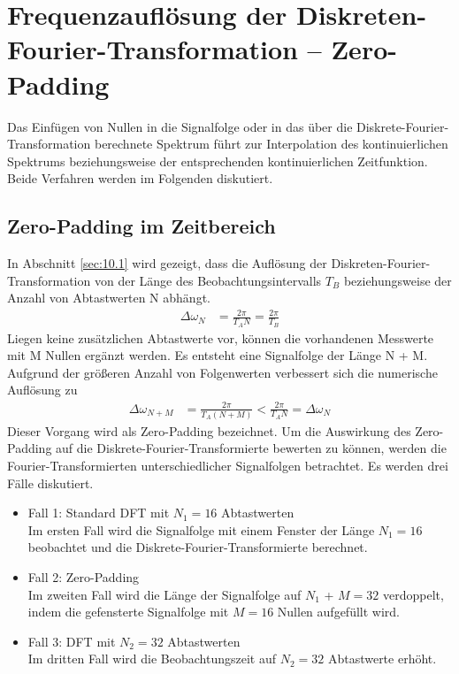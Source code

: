 \section{Frequenzauflösung der Diskreten-Fourier-Transformation -- Zero-Padding}\label{sec:10.4}

Das Einfügen von Nullen in die Signalfolge oder in das über die Diskrete-Fourier-Transformation berechnete Spektrum führt zur Interpolation des kontinuierlichen Spektrums beziehungsweise der entsprechenden kontinuierlichen Zeitfunktion. Beide Verfahren werden im Folgenden diskutiert.

\subsection{Zero-Padding im Zeitbereich}\label{sec:zero-padding-im-zeitbereich}

In Abschnitt \ref{sec:10.1} wird gezeigt, dass die Auflösung der Diskreten-Fourier-Transformation von der Länge des Beobachtungsintervalls \(T_{B}\) beziehungsweise der Anzahl von Abtastwerten N abhängt.
\begin{align}
\Delta\omega_{N} &= \frac{2  \pi}{T_{A}  N} = \frac{2  \pi}{T_{B}} \label{eq:10.75}
\end{align}
Liegen keine zusätzlichen Abtastwerte vor, können die vorhandenen Messwerte mit M Nullen ergänzt werden. Es entsteht eine Signalfolge der Länge N + M. Aufgrund der größeren Anzahl von Folgenwerten verbessert sich die numerische Auflösung zu
\begin{align}
\Delta\omega_{N + M} &= \frac{2  \pi}{T_{A}  (N + M)} < \frac{2  \pi}{T_{A}  N} = \Delta\omega_{N} \label{eq:10.76}
\end{align}
Dieser Vorgang wird als Zero-Padding bezeichnet. Um die Auswirkung des Zero-Padding auf die Diskrete-Fourier-Transformierte bewerten zu können, werden die Fourier-Transformierten unterschiedlicher Signalfolgen betrachtet. Es werden drei Fälle diskutiert.

\begin{itemize}
\item
  Fall 1: Standard DFT mit \(N_{1} = 16\) Abtastwerten\\
  Im ersten Fall wird die Signalfolge mit einem Fenster der Länge \(N_{1} = 16\) beobachtet und die Diskrete-Fourier-Transformierte berechnet.
\item
  Fall 2: Zero-Padding\\
  Im zweiten Fall wird die Länge der Signalfolge auf \(N_{1}\) + \(M = 32\) verdoppelt, indem die gefensterte Signalfolge mit \(M = 16\) Nullen aufgefüllt wird.
\item
  Fall 3: DFT mit \(N_{2} = 32\) Abtastwerten\\
  Im dritten Fall wird die Beobachtungszeit auf \(N_{2} = 32\) Abtastwerte erhöht.
\end{itemize}

